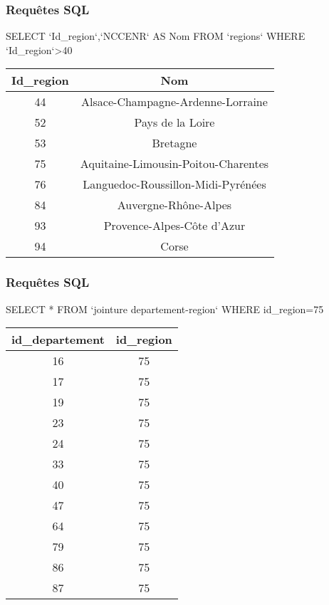\begin{frame}[fragile]
\frametitle{Requêtes SQL}
\begin{GrayBox}[0.85\textwidth]
\begin{semiverbatim}\small
SELECT `Id_region`,`NCCENR` AS Nom
FROM `regions`
WHERE `Id_region`>40
\end{semiverbatim}
\end{GrayBox}

\begin{center}
\begin{tabular}{|c|c|}
\hline
Id\_region & Nom \\
\hline
44 & Alsace-Champagne-Ardenne-Lorraine \\
\hline
52 & Pays de la Loire \\
\hline
53 & Bretagne \\
\hline
75 & Aquitaine-Limousin-Poitou-Charentes \\
\hline
76 & Languedoc-Roussillon-Midi-Pyrénées \\
\hline
84 & Auvergne-Rhône-Alpes \\
\hline
93 & Provence-Alpes-Côte d'Azur \\
\hline
94 & Corse \\
\hline
\end{tabular}
\end{center}
\end{frame}

\begin{frame}[fragile]
\frametitle{Requêtes SQL}


\begin{GrayBox}[0.85\textwidth]
\begin{semiverbatim}\small
SELECT * FROM `jointure departement-region` WHERE id_region=75
\end{semiverbatim}
\end{GrayBox}

\begin{center}
\begin{tabular}{|c|c|}
\hline
\textbf{id\_departement} & \textbf{id\_region} \\
\hline
16 & 75 \\
\hline
17 & 75 \\
\hline
19 & 75 \\
\hline
23 & 75 \\
\hline
24 & 75 \\
\hline
33 & 75 \\
\hline
40 & 75 \\
\hline
47 & 75 \\
\hline
64 & 75 \\
\hline
79 & 75 \\
\hline
86 & 75 \\
\hline
87 & 75 \\
\hline
\end{tabular}
\end{center}
\end{frame}


